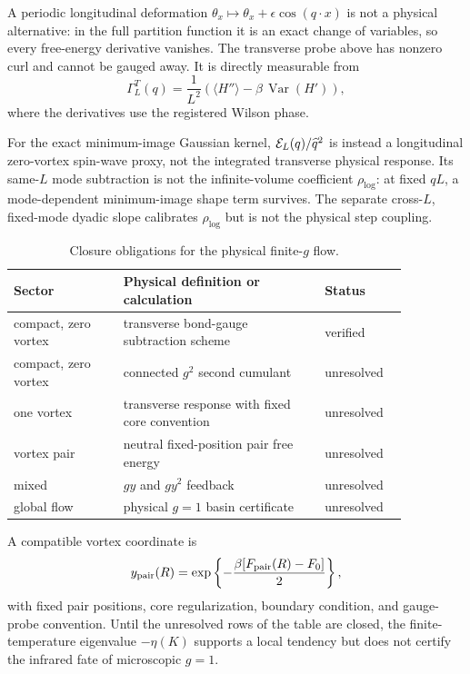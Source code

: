 \documentclass[aps,prb,preprint,notitlepage,groupedaddress,amsmath,amssymb,
               superscriptaddress,nofootinbib,floatfix]{revtex4-2}
\theoremstyle{definition}
\theoremstyle{plain}
\begin{document}
A periodic longitudinal deformation
$\theta_x\mapsto\theta_x+\epsilon\cos(q\cdot x)$ is not a physical
alternative: in the full partition function it is an exact change of
variables, so every free-energy derivative vanishes.  The transverse
probe above has nonzero curl and cannot be gauged away.  It is directly
measurable from
\begin{equation}
 \Gamma^T_L(q)
 =
 \frac1{L^2}
 \left(\langle H''\rangle-\beta\,\operatorname{Var}(H')\right),
\end{equation}
where the derivatives use the registered Wilson phase.

For the exact minimum-image Gaussian kernel,
${\cal E}_L(q)/\widehat q^2$ is instead a longitudinal zero-vortex
spin-wave proxy, not the integrated transverse physical response.
Its same-$L$ mode subtraction is not the infinite-volume coefficient
$\rho_{\log}$: at fixed $qL$, a mode-dependent minimum-image shape term
survives.  The separate cross-$L$, fixed-mode dyadic slope calibrates
$\rho_{\log}$ but is not the physical step coupling.

\begin{table}[htbp]
\caption{Closure obligations for the physical finite-$g$ flow.}
\begin{ruledtabular}
\begin{tabular}{p{0.24\linewidth}p{0.44\linewidth}p{0.18\linewidth}}
Sector & Physical definition or calculation & Status\\
\hline
compact, zero vortex &
transverse bond-gauge subtraction scheme & verified\\
compact, zero vortex &
connected $g^2$ second cumulant & unresolved\\
one vortex &
transverse response with fixed core convention & unresolved\\
vortex pair &
neutral fixed-position pair free energy & unresolved\\
mixed &
$gy$ and $gy^2$ feedback & unresolved\\
global flow &
physical $g=1$ basin certificate & unresolved\\
\end{tabular}
\end{ruledtabular}
\end{table}

A compatible vortex coordinate is
\begin{equation}
 y_{\rm pair}(R)
 =
 \exp\left\{
 -\frac{\beta[F_{\rm pair}(R)-F_0]}{2}
 \right\},
\end{equation}
with fixed pair positions, core regularization, boundary condition, and
gauge-probe convention.  Until the unresolved rows of the table are closed, the
finite-temperature eigenvalue $-\eta(K)$ supports a local tendency but
does not certify the infrared fate of microscopic $g=1$.
\end{document}
